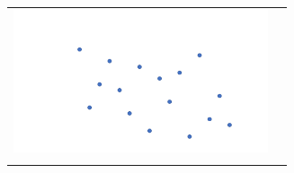 \documentclass[a4paper,12pt]{article}
\begin{document}
\begin{center}
\begin{tabular}{|c|c|}
\hspace{10pt}\includegraphics[width=7.5cm]{../images/spatial_subd.pdf}
\hspace{10pt} & \hspace{10pt} \\
 & \\
\hline
\end{tabular}
\end{center}
\end{document}
